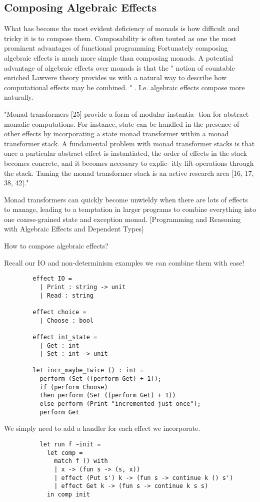 \subsection{Composing Algebraic Effects}
What has become the most evident deficiency of monads is
how difficult and tricky it is to compose them.
Composability is often touted as one the most
prominent advantages of functional programming
Fortunately composing algebraic effects is much more simple than composing monads.
A potential advantage of algebraic effects over monads is that
the "
notion of countable enriched Lawvere theory
provides us with a natural way to describe
how computational effects may be combined.
"
\cite{plotkin2004computational}.
I.e. algebraic effects compose more naturally.

"Monad transformers [25] provide a form of modular instantia- tion for abstract monadic computations. For instance, state can be handled in the presence of other effects by incorporating a state monad transformer within a monad transformer stack.
A fundamental problem with monad transformer stacks is that once a particular abstract effect is instantiated, the order of effects in the stack becomes concrete, and it becomes necessary to explic- itly lift operations through the stack. Taming the monad transformer stack is an active research area [16, 17, 38, 42]."
\cite{kammar2013handlers}

Monad transformers can quickly become unwieldy when there are lots of effects to manage,
leading to a temptation in larger programs to combine everything into one coarse-grained state and exception monad.
[Programming and Reasoning with Algebraic Effects and Dependent Types]

How to compose algebraic effects?
\begin{example}
    Recall our IO and non-determinism examples
    we can combine them with ease!
    \begin{verbatim}
        effect IO =
          | Print : string -> unit
          | Read : string

        effect choice =
          | Choose : bool

        effect int_state =
          | Get : int
          | Set : int -> unit

        let incr_maybe_twice () : int =
          perform (Set ((perform Get) + 1));
          if (perform Choose)
          then perform (Set ((perform Get) + 1))
          else perform (Print "incremented just once");
          perform Get
    \end{verbatim}
    We simply need to add a handler for each effect we incorporate.
    \begin{verbatim}
          let run f ~init =
            let comp =
              match f () with
              | x -> (fun s -> (s, x))
              | effect (Put s') k -> (fun s -> continue k () s')
              | effect Get k -> (fun s -> continue k s s)
            in comp init
    \end{verbatim}
\end{example}

